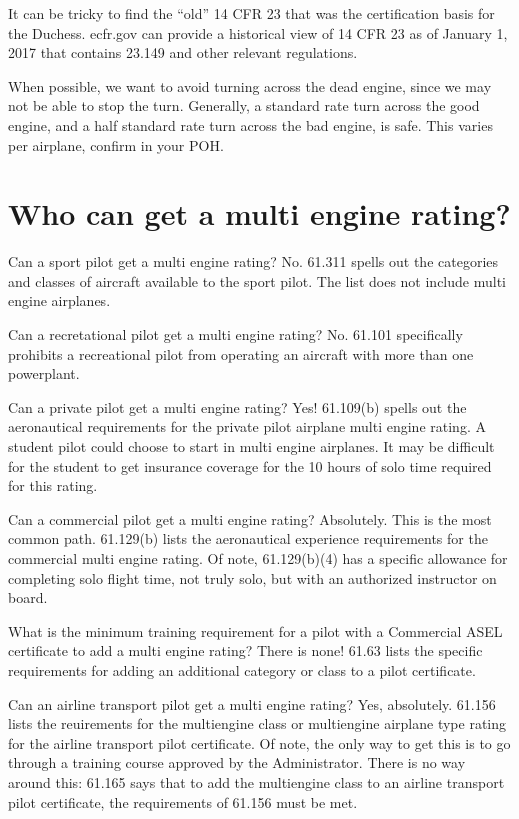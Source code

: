 {It can be tricky to find the ``old'' 14 CFR 23 that was the certification basis for the Duchess. ecfr.gov can provide
a historical view of 14 CFR 23 as of January 1, 2017 that contains 23.149 and other relevant regulations.

When possible, we want to avoid turning across the dead engine, since we may not be able to
stop the turn. Generally, a standard rate turn across the good engine, and a half standard rate turn across
the bad engine, is safe. This varies per airplane, confirm in your POH.

\section{Who can get a multi engine rating?}

Can a sport pilot get a multi engine rating? No. 61.311 spells out the categories and classes
of aircraft available to the sport pilot. The list does not include multi engine airplanes.

Can a recretational pilot get a multi engine rating? No. 61.101 specifically prohibits
a recreational pilot from operating an aircraft with more than one powerplant.

Can a private pilot get a multi engine rating? Yes! 61.109(b) spells out the aeronautical requirements
for the private pilot airplane multi engine rating. A student pilot could choose to start in multi
engine airplanes. It may be difficult for the student to get insurance coverage for the 10 hours
of solo time required for this rating.

Can a commercial pilot get a multi engine rating? Absolutely. This is the most common path.
61.129(b) lists the aeronautical experience requirements for the commercial multi engine rating.
Of note, 61.129(b)(4) has a specific allowance for completing solo flight time, not truly solo, but
with an authorized instructor on board.

What is the minimum training requirement for a pilot with a Commercial ASEL certificate
to add a multi engine rating? There is none! 61.63 lists the specific requirements for adding an
additional category or class to a pilot certificate.

Can an airline transport pilot get a multi engine rating? Yes, absolutely. 61.156 lists the reuirements
for the multiengine class or multiengine airplane type rating for the airline transport pilot certificate.
Of note, the only way to get this is to go through a training course approved by the Administrator. There is
no way around this: 61.165 says that to add the multiengine class to an airline transport pilot certificate,
the requirements of 61.156 must be met.

}
